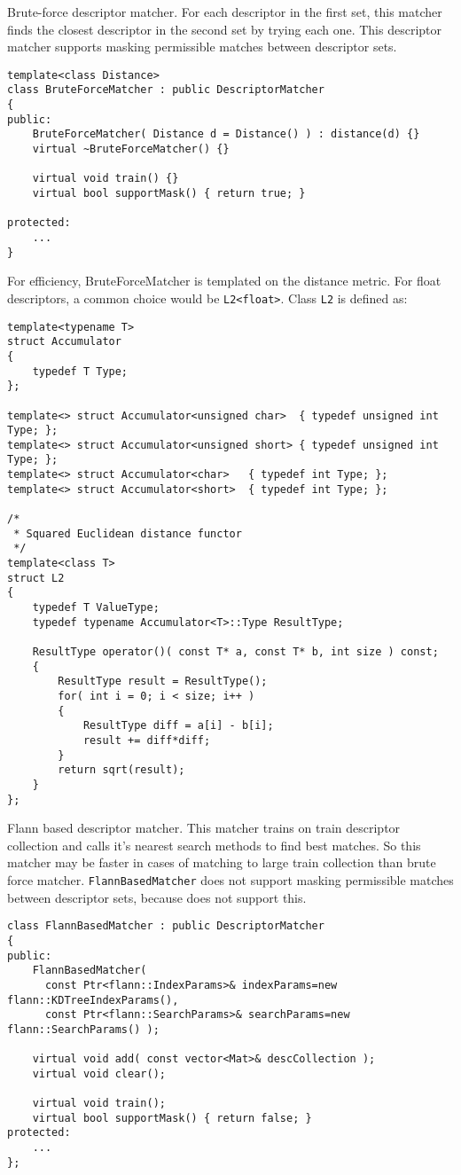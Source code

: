 Brute-force descriptor matcher. For each descriptor in the first set, this matcher finds the closest
descriptor in the second set by trying each one. This descriptor matcher supports masking 
permissible matches between descriptor sets.

\begin{lstlisting}
template<class Distance>
class BruteForceMatcher : public DescriptorMatcher
{
public:
    BruteForceMatcher( Distance d = Distance() ) : distance(d) {}
    virtual ~BruteForceMatcher() {}

    virtual void train() {}
    virtual bool supportMask() { return true; }

protected:
    ...
}
\end{lstlisting}

For efficiency, BruteForceMatcher is templated on the distance metric.
For float descriptors, a common choice would be \texttt{L2<float>}. Class \texttt{L2} is defined as:
\begin{lstlisting}
template<typename T>
struct Accumulator
{
    typedef T Type;
};

template<> struct Accumulator<unsigned char>  { typedef unsigned int Type; };
template<> struct Accumulator<unsigned short> { typedef unsigned int Type; };
template<> struct Accumulator<char>   { typedef int Type; };
template<> struct Accumulator<short>  { typedef int Type; };

/*
 * Squared Euclidean distance functor
 */
template<class T>
struct L2
{
    typedef T ValueType;
    typedef typename Accumulator<T>::Type ResultType;

    ResultType operator()( const T* a, const T* b, int size ) const;
    {
        ResultType result = ResultType();
        for( int i = 0; i < size; i++ )
        {
            ResultType diff = a[i] - b[i];
            result += diff*diff;
        }
        return sqrt(result);
    }
};
\end{lstlisting}

Flann based descriptor matcher. This matcher trains  on 
train descriptor collection and calls it's nearest search methods to find best matches. 
So this matcher may be faster in cases of matching to large train collection than 
brute force matcher. \texttt{FlannBasedMatcher} does not support masking permissible 
matches between descriptor sets, because  does not 
support this.

\begin{lstlisting}
class FlannBasedMatcher : public DescriptorMatcher
{
public:
    FlannBasedMatcher( 
      const Ptr<flann::IndexParams>& indexParams=new flann::KDTreeIndexParams(),
      const Ptr<flann::SearchParams>& searchParams=new flann::SearchParams() );

    virtual void add( const vector<Mat>& descCollection );
    virtual void clear();

    virtual void train();
    virtual bool supportMask() { return false; }
protected:
    ...
};
\end{lstlisting}

